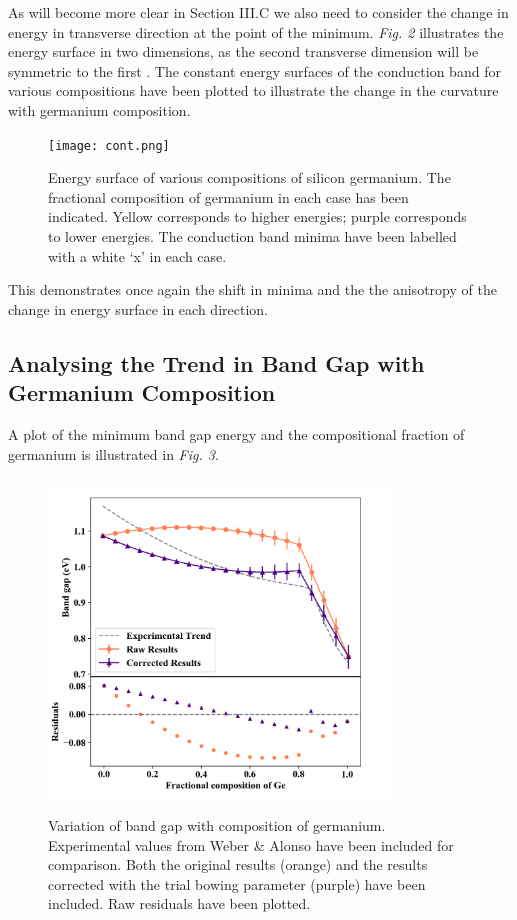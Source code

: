 \documentclass[10pt, twocolumn]{revtex4}    %
\begin{document}
As will become more clear in Section III.C we also need to consider the change in energy in transverse direction at the point of the minimum. \textit{Fig. 2} illustrates the energy surface in two dimensions, as the second transverse dimension will be symmetric to the first \cite{ref16}. The constant energy surfaces of the conduction band for various compositions have been plotted to illustrate the change in the curvature with germanium composition.
\begin{figure}[h!]
 \hspace*{-0.5cm}
  \texttt{[image: cont.png]}

    \caption{Energy surface of various compositions of silicon germanium. The fractional composition of germanium in each case has been indicated. Yellow corresponds to higher energies; purple corresponds to lower energies. The conduction band minima have been labelled with a white `x' in each case.}
\end{figure}

This demonstrates once again the shift in minima and the the anisotropy of the change in energy surface in each direction.

\subsection{Analysing the Trend in Band Gap with Germanium Composition}

A plot of the minimum band gap energy and the compositional fraction of germanium is illustrated in \textit{Fig. 3}.
\begin{figure}[h!]
 \hspace*{-0.5cm}
  \includegraphics[width=260pt,height=250pt]{bg.png}

    \caption{Variation of band gap with composition of germanium. Experimental values from Weber \& Alonso \cite{ref12} have been included for comparison. Both the original results (orange) and the results corrected with the trial bowing parameter (purple) have been included. Raw residuals have been plotted.}
\end{figure}
\end{document}
